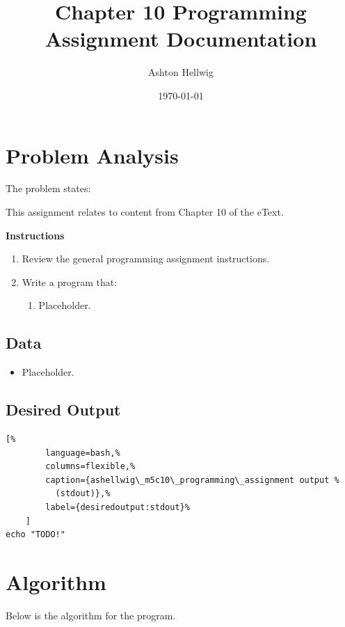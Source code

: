 \documentclass[a4paper, 11pt]{article}
\title{Chapter 10 Programming Assignment Documentation}
\author{Ashton Hellwig}
\date\today
\theoremstyle{definition}
\theoremstyle{plain}
\begin{document}
  \maketitle
  \tableofcontents
  \listofalgorithms
  \lstlistoflistings
  \newpage


  \section{Problem Analysis}
    The problem states:
    \begin{mdframed}[backgroundcolor=green!20]
      This assignment relates to content from Chapter 10 of the eText.

      \textbf{Instructions}\vspace{-8pt}
      \begin{enumerate}
        \item Review the general programming assignment instructions.
        \item Write a program that:
          \begin{enumerate}[label=\Alph*.]
            \item Placeholder.
          \end{enumerate}
      \end{enumerate}
    \end{mdframed}

    \subsection{Data}
      \begin{itemize}
        \item Placeholder.
      \end{itemize}

    \subsection{Desired Output}
      \begin{lstlisting}[%
        language=bash,%
        columns=flexible,%
        caption={ashellwig\_m5c10\_programming\_assignment output %
          (stdout)},%
        label={desiredoutput:stdout}%
    ]
echo "TODO!"
  \end{lstlisting}


  \newpage
  \section{Algorithm}
    Below is the algorithm for the program.
\end{document}

